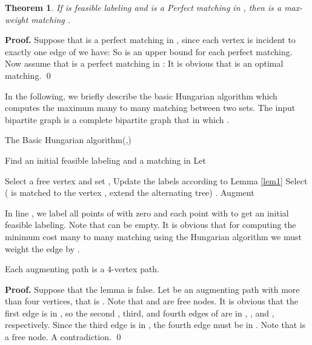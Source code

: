 \documentclass[preprint,12pt]{elsarticle}
\begin{document}
\newtheorem{theorem}{Theorem}
\begin{theorem}
If  is feasible labeling and  is a Perfect matching in , then  is a max-weight matching \cite{8}.
\end{theorem}
\textbf {Proof.} Suppose that  is a perfect matching in , since each  vertex is incident to exactly one edge of  we have:
 So  is an upper bound for each perfect matching. Now assume that  is a perfect matching in :
 It is obvious that  is an optimal matching. 
\qed

In the following, we briefly describe the basic Hungarian algorithm which computes the maximum many to many matching between two sets. The input bipartite graph  is a complete bipartite graph that in which . 


\makeatletter
\expandafter\patchcmd\csname\string\algorithmic{}
\makeatother

\begin{algorithm}
\caption{The Basic Hungarian algorithm(,)}
\begin{algorithmic}[1]
\Initial \Comment Find an initial feasible labeling  and a matching  in 
\State Let 
\State 
\State 
{}

 \State Select a free vertex  and set , 
  \Repeat
     \While {}
        \State Update the labels according to Lemma \ref{lem1}
        \EndWhile
         \State Select  
          \Comment ( is matched to the vertex , extend the alternating tree)
            \State .
           \EndIf
    \State Augment 
\EndWhile
\Return 
\end{algorithmic}
 \end{algorithm}


In line , we label all points of  with zero and each point  with  to get an initial feasible labeling. Note that  can be empty. It is obvious that for computing the minimum cost many to many matching using the Hungarian algorithm we must weight the edge  by .   


\begin{lemma}
Each augmenting path is a 4-vertex path.
\end{lemma}
\textbf {Proof.} Suppose that the lemma is false. Let  be an augmenting path with more than four vertices, that is . Note that  and  are free nodes. It is obvious that the first edge is in , so the second , third, and fourth edges of  are in , , and , respectively. Since the third edge  is in , the fourth edge  must be in . Note that  is a free node. A contradiction. 
\qed
\end{document}
